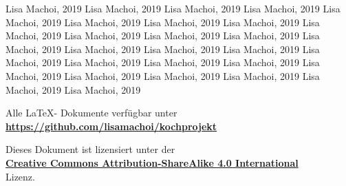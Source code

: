 \documentclass[10pt,a4paper]{article}
\begin{document}
\newpage
\renewcommand{\refname}{\textsc{Bilderverzeichnis}}
\begin{thebibliography}{9}

	 Lisa Machoi, 2019
	 Lisa Machoi, 2019
	 Lisa Machoi, 2019
	 Lisa Machoi, 2019
	 Lisa Machoi, 2019	
	 Lisa Machoi, 2019
	 Lisa Machoi, 2019
	 Lisa Machoi, 2019
	 Lisa Machoi, 2019
	 Lisa Machoi, 2019
	 Lisa Machoi, 2019
	 Lisa Machoi, 2019
	 Lisa Machoi, 2019
	 Lisa Machoi, 2019
	 Lisa Machoi, 2019
	 Lisa Machoi, 2019
	 Lisa Machoi, 2019
	 Lisa Machoi, 2019
	 Lisa Machoi, 2019
	 Lisa Machoi, 2019
	 Lisa Machoi, 2019
	 Lisa Machoi, 2019
	 Lisa Machoi, 2019
	 Lisa Machoi, 2019
	 Lisa Machoi, 2019
	 Lisa Machoi, 2019

\end{thebibliography}
	\vspace{1cm}
\begin{center}
	Alle \LaTeX - Dokumente verfügbar unter\\ \href{https://github.com/lisamachoi/kochprojekt}{\textbf{https://github.com/lisamachoi/kochprojekt}}
	
	\vspace{1cm}
	
	Dieses Dokument ist lizensiert unter der\\ \href{https://creativecommons.org/licenses/by-sa/4.0/}{\textbf{Creative Commons Attribution-ShareAlike 4.0 International}}\\
	Lizenz.

	\vspace{1cm}

	{\huge\ccbysa}
\end{center}
\end{document}

